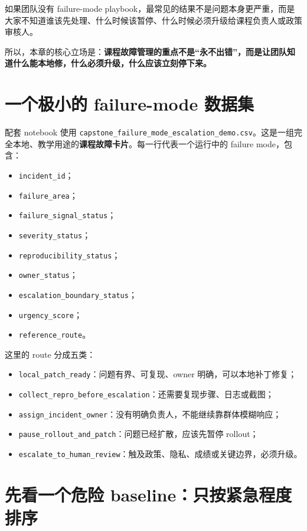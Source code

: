 如果团队没有 failure-mode playbook，最常见的结果不是问题本身更严重，而是大家不知道谁该先处理、什么时候该暂停、什么时候必须升级给课程负责人或政策审核人。

所以，本章的核心立场是：\textbf{课程故障管理的重点不是“永不出错”，而是让团队知道什么能本地修，什么必须升级，什么应该立刻停下来。}

\section{一个极小的 failure-mode 数据集}

配套 notebook 使用 \nolinkurl{capstone_failure_mode_escalation_demo.csv}。这是一组完全本地、教学用途的\textbf{课程故障卡片}。每一行代表一个运行中的 failure mode，包含：

\begin{itemize}
    \item \texttt{incident\_id}；
    \item \texttt{failure\_area}；
    \item \texttt{failure\_signal\_status}；
    \item \texttt{severity\_status}；
    \item \texttt{reproducibility\_status}；
    \item \texttt{owner\_status}；
    \item \texttt{escalation\_boundary\_status}；
    \item \texttt{urgency\_score}；
    \item \texttt{reference\_route}。
\end{itemize}

这里的 route 分成五类：

\begin{itemize}
    \item \texttt{local\_patch\_ready}：问题有界、可复现、owner 明确，可以本地补丁修复；
    \item \texttt{collect\_repro\_before\_escalation}：还需要复现步骤、日志或截图；
    \item \texttt{assign\_incident\_owner}：没有明确负责人，不能继续靠群体模糊响应；
    \item \texttt{pause\_rollout\_and\_patch}：问题已经扩散，应该先暂停 rollout；
    \item \texttt{escalate\_to\_human\_review}：触及政策、隐私、成绩或关键边界，必须升级。
\end{itemize}

\section{先看一个危险 baseline：只按紧急程度排序}

